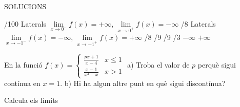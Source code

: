 \documentclass[11pt, a4paper]{book}
\begin{document}
SOLUCIONS
\begin{enumerate}
  /100
  \task Laterals  $\mathop{lim}\limits_{x\to 0^- } f(x)=+\infty$, $\mathop{lim}\limits_{x\to 0^+ } f(x)=-\infty$
  /8
  \task Laterals  $\mathop{lim}\limits_{x\to -1^- } f(x)=-\infty$, $\mathop{lim}\limits_{x\to -1^+ } f(x)=+\infty$
  /8
  /9
  /9
  /3
  \task $-\infty$
  \task $+\infty$
\end{enumerate}

En la funció $f(x)=\left\{ \begin{array}{ll}
                             \frac{px+1}{x-4}  & x \leq 1 \\
                             \frac{x-1}{x^2-x} & x > 1
                           \end{array} \right.$
a) Troba el valor de $p$ perquè sigui contínua en $x=1$. b) Hi ha algun altre punt en què sigui discontínua?





Calcula els límits
\end{document}
